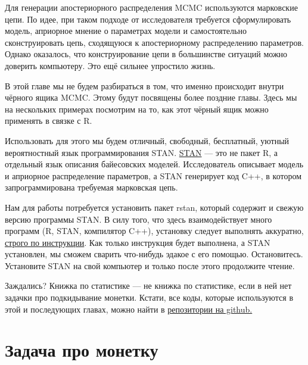   Для генерации апостериорного распределения MCMC используются марковские цепи. По идее, при таком подходе от исследователя требуется сформулировать модель, априорное мнение о параметрах модели и самостоятельно сконструировать цепь, сходящуюся к апостериорному распределению параметров. Однако оказалось, что конструирование цепи в большинстве ситуаций можно доверить компьютеру. Это ещё сильнее упростило жизнь.
 
 В этой главе мы не будем разбираться в том, что именно происходит внутри чёрного ящика MCMC. Этому будут посвящены более поздние главы. Здесь мы на нескольких примерах посмотрим на то, как этот чёрный ящик можно применять в связке с R.
 
 Использовать для этого мы будем отличный, свободный, бесплатный, уютный вероятностный язык программирования STAN.  \href{http://mc-stan.org}{STAN} --- это не пакет R, а отдельный язык описания байесовских моделей. Исследователь описывает модель и априорное распределение параметров, а STAN генерирует код C++, в котором запрограммирована требуемая марковская цепь. %
 
 Нам для работы потребуется установить пакет rstan, который содержит и свежую версию программы STAN. В силу того, что здесь взаимодействует много программ (R, STAN, компилятор C++), установку следует выполнять аккуратно,  \href{http://bdemeshev.github.io/em301/r_stan_installation/r_stan_installation.html}{строго по инструкции}.   Как только инструкция будет выполнена, а STAN установлен, мы сможем сварить что-нибудь эдакое с его помощью.  Остановитесь. Установите STAN на свой компьютер и только после этого продолжите чтение. 
 
 Заждались? Книжка по статистике --- не книжка по статистике, если в ней нет задачки про подкидывание монетки.  Кстати,  все коды, которые используются в этой и последующих главах, можно найти в \href{https://github.com/FUlyankin/bayes_book/tree/master/itog_scripts}{репозитории на github.}
 
 \section{Задача про монетку}
 
